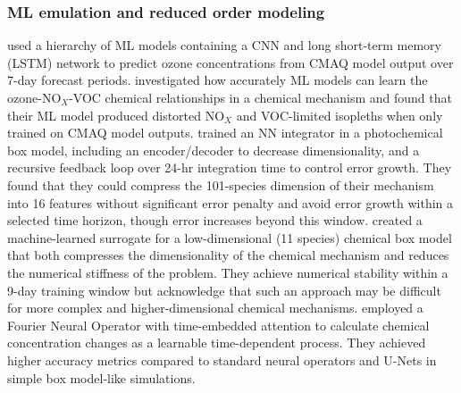 \documentclass[gmd, manuscript]{copernicus}
\begin{document}
\subsubsection{ML emulation and reduced order modeling}
\citet{Xing2020} used a hierarchy of ML models containing a CNN and long short-term memory (LSTM) network to predict ozone concentrations from CMAQ model output over 7-day forecast periods.\citet{kuo_ozone_2023} investigated how accurately ML models can learn the ozone-NO$_X$-VOC chemical relationships in a chemical mechanism and found that their ML model produced distorted NO$_X$ and VOC-limited isopleths when only trained on CMAQ model outputs. \citet{kelp_online-learned_nodate} trained an NN integrator in a photochemical box model, including an encoder/decoder to decrease dimensionality, and a recursive feedback loop over 24-hr integration time to control error growth. They found that they could compress the 101-species dimension of their mechanism into 16 features without significant error penalty and avoid error growth within a selected time horizon, though error increases beyond this window. \citet{yang_atmospheric_2024} created a machine-learned surrogate for a low-dimensional (11 species) chemical box model that both compresses the dimensionality of the chemical mechanism and reduces the numerical stiffness of the problem. They achieve numerical stability within a 9-day training window but acknowledge that such an approach may be difficult for more complex and higher-dimensional chemical mechanisms. \citet{liu_2024} employed a Fourier Neural Operator with time-embedded attention to calculate chemical concentration changes as a learnable time-dependent process. They achieved higher accuracy metrics compared to standard neural operators and U-Nets in simple box model-like simulations. 
\end{document}
